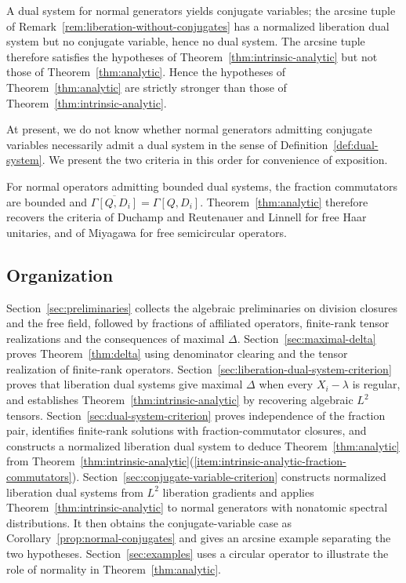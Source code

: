 A dual system for normal generators yields conjugate variables; the arcsine tuple of Remark~\ref{rem:liberation-without-conjugates} has a normalized liberation dual system but no conjugate variable, hence no dual system.
The arcsine tuple therefore satisfies the hypotheses of Theorem~\ref{thm:intrinsic-analytic} but not those of Theorem~\ref{thm:analytic}.
Hence the hypotheses of Theorem~\ref{thm:analytic} are strictly stronger than those of Theorem~\ref{thm:intrinsic-analytic}.

At present, we do not know whether normal generators admitting conjugate variables necessarily admit a dual system in the sense of Definition~\ref{def:dual-system}.
We present the two criteria in this order for convenience of exposition.
 
For normal operators admitting bounded dual systems, the fraction commutators are bounded and $\overline{\Gamma[Q,D_i]}=\Gamma[Q,D_i]$.
Theorem~\ref{thm:analytic} therefore recovers the criteria of Duchamp and Reutenauer and Linnell for free Haar unitaries, and of Miyagawa for free semicircular operators.

\subsection{Organization}\label{subsec:organization}

Section~\ref{sec:preliminaries} collects the algebraic preliminaries on division closures and the free field, followed by fractions of affiliated operators, finite-rank tensor realizations and the consequences of maximal $\Delta$.
Section~\ref{sec:maximal-delta} proves Theorem~\ref{thm:delta} using denominator clearing and the tensor realization of finite-rank operators.
Section~\ref{sec:liberation-dual-system-criterion} proves that liberation dual systems give maximal $\Delta$ when every $X_i-\lambda$ is regular, and establishes Theorem~\ref{thm:intrinsic-analytic} by recovering algebraic $L^2$ tensors.
Section~\ref{sec:dual-system-criterion} proves independence of the fraction pair, identifies finite-rank solutions with fraction-commutator closures, and constructs a normalized liberation dual system to deduce Theorem~\ref{thm:analytic} from Theorem~\ref{thm:intrinsic-analytic}\textup{(\ref{item:intrinsic-analytic-fraction-commutators})}.
Section~\ref{sec:conjugate-variable-criterion} constructs normalized liberation dual systems from $L^2$ liberation gradients and applies Theorem~\ref{thm:intrinsic-analytic} to normal generators with nonatomic spectral distributions.
It then obtains the conjugate-variable case as Corollary~\ref{prop:normal-conjugates} and gives an arcsine example separating the two hypotheses.
Section~\ref{sec:examples} uses a circular operator to illustrate the role of normality in Theorem~\ref{thm:analytic}.
